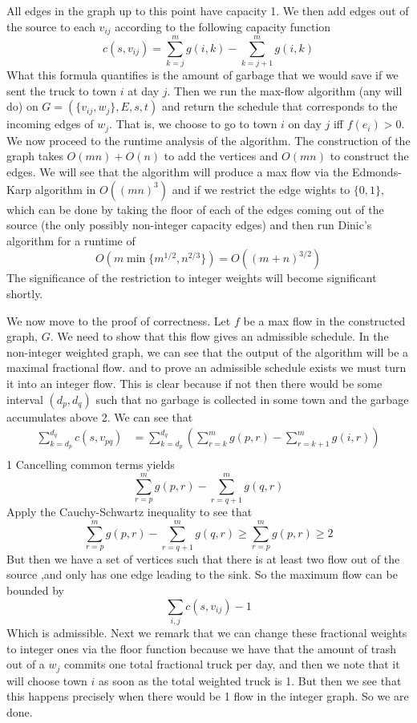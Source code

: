 \documentclass{article}
\begin{document}
All edges in the graph up to this point have capacity 1. We then add edges out of the source to each $v_{ij}$ according to the following capacity function
\[
c(s,v_{ij}) = \sum_{k=j}^mg(i,k) - \sum_{k = j+1}^m g(i,k)
\]
What this formula quantifies is the amount of garbage that we would save if we sent the truck to town $i$ at day $j$. Then we run the max-flow algorithm (any will do) on $G = (\{v_{ij}, w_j\} , E, s, t)$ and return the schedule that corresponds to the incoming edges of $w_j$. That is, we choose to go to town $i$ on day $j$ iff $f(e_i) > 0$. \\

We now proceed to the runtime analysis of the algorithm. The construction of the graph takes $O(mn) + O(n)$ to add the vertices and $O(mn)$ to construct the edges. We will see that the algorithm will produce a max flow via the Edmonds-Karp algorithm in $O((mn)^3)$ and if we restrict the edge wights to $\{0,1\}$, which can be done by taking the floor of each of the edges coming out of the source (the only possibly non-integer capacity edges) and then run Dinic's algorithm for a runtime of 
\[
O(m\min\{m^{1/2}, n^{2/3}\}) = O((m+n)^{3/2})
\]
The significance of the restriction to integer weights will become significant shortly. 

We now move to the proof of correctness. Let $f$ be a max flow in the constructed graph, $G$. We need to show that this flow gives an admissible schedule. In the non-integer weighted graph, we can see that the output of the algorithm will be a maximal fractional flow. and to prove an admissible schedule exists we must turn it into an integer flow. This is clear because if not then there would be some interval $(d_p, d_q)$ such that no garbage is collected in some town and the garbage accumulates above 2. We can see that 
\begin{align*}
\sum_{k = d_p}^{d_q} c(s, v_{pq}) &= \sum_{k = d_p}^{d_q} \left(\sum_{r=k}^m g(p,r) - \sum_{r = k+1}^m g(i,r)\right) \\ 
\end{align*}1
Cancelling common terms yields
\[
\sum_{r=p}^m g(p,r) - \sum_{r = q+1}^m g(q,r)
\]
Apply the Cauchy-Schwartz inequality to see that
\[
\sum_{r=p}^m g(p,r) - \sum_{r = q+1}^m g(q,r) \geq \sum_{r=p}^m g(p,r) \geq 2
\]
But then we have a set of vertices such that there is at least two flow out of the source ,and only has one edge leading to the sink. So the maximum flow can be bounded by
\[
\sum_{i,j} c(s, v_{ij}) - 1
\]
Which is admissible. Next we remark that we can change these fractional weights to integer ones via the floor function because we have that the amount of trash out of a $w_j$ commits one total fractional truck per day, and then we note that it will choose town $i$ as soon as the total weighted truck is 1. But then we see that this happens precisely when there would be 1 flow in the integer graph. So we are done. 
\end{document}
